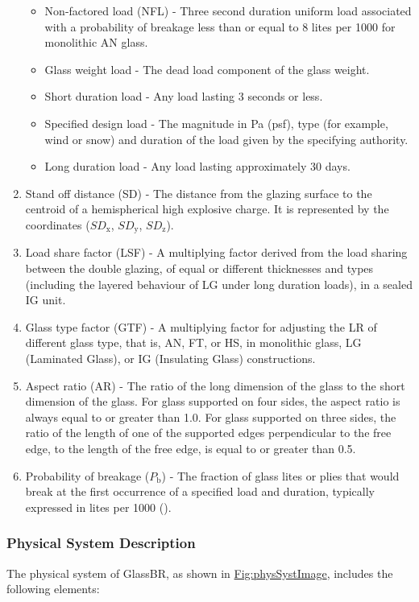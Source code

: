 \documentclass[12pt]{article}
\begin{document}
\begin{enumerate}
\begin{itemize}
\item{Non-factored load (NFL) - Three second duration uniform load associated with a probability of breakage less than or equal to 8 lites per 1000 for monolithic AN glass.}
\item{Glass weight load - The dead load component of the glass weight.}
\item{Short duration load - Any load lasting 3 seconds or less.}
\item{Specified design load - The magnitude in Pa (psf), type (for example, wind or snow) and duration of the load given by the specifying authority.}
\item{Long duration load - Any load lasting approximately 30 days.}
\end{itemize}
\item{Stand off distance (SD) - The distance from the glazing surface to the centroid of a hemispherical high explosive charge. It is represented by the coordinates (${\mathit{SD}_{\text{x}}}$, ${\mathit{SD}_{\text{y}}}$, ${\mathit{SD}_{\text{z}}}$).}
\item{Load share factor (LSF) - A multiplying factor derived from the load sharing between the double glazing, of equal or different thicknesses and types (including the layered behaviour of LG under long duration loads), in a sealed IG unit.}
\item{Glass type factor (GTF) - A multiplying factor for adjusting the LR of different glass type, that is, AN, FT, or HS, in monolithic glass, LG (Laminated Glass), or IG (Insulating Glass) constructions.}
\item{Aspect ratio (AR) - The ratio of the long dimension of the glass to the short dimension of the glass. For glass supported on four sides, the aspect ratio is always equal to or greater than 1.0. For glass supported on three sides, the ratio of the length of one of the supported edges perpendicular to the free edge, to the length of the free edge, is equal to or greater than 0.5.}
\item{Probability of breakage (${P_{\text{b}}}$) - The fraction of glass lites or plies that would break at the first occurrence of a specified load and duration, typically expressed in lites per 1000 (\cite{astm2016}).}
\end{enumerate}
\subsubsection{Physical System Description}
\label{Sec:PhysSyst}
The physical system of GlassBR, as shown in \hyperref[Figure:physSystImage]{Fig:physSystImage}, includes the following elements:
\end{document}
